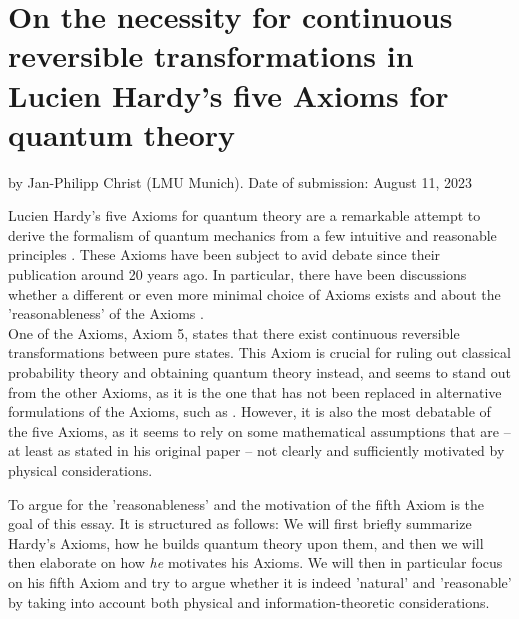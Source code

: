 \documentclass[11pt, a4paper]{article}
\begin{document}
\pagestyle{fancy}
\renewcommand{\headrulewidth}{0pt}
\renewcommand{\footrulewidth}{0pt}
\fancyhf{}

\section*{On the necessity for continuous reversible transformations in Lucien Hardy's five Axioms for quantum theory}
\vspace{-0.3cm}
\textsf{by Jan-Philipp Christ (LMU Munich). Date of submission: August 11, 2023}\par
\vspace{4pt}
Lucien Hardy's five Axioms for quantum theory are a remarkable attempt to derive the formalism of quantum mechanics from a few intuitive and reasonable principles \cite{hardy2001quantum}. These Axioms have been subject to avid debate since their publication around 20 years ago. In particular, there have been discussions whether a different or even more minimal choice of Axioms exists \cite{Schack_2003, Masanes_2011} and about the 'reasonableness' of the Axioms \cite{DARRIGOL}.\\
One of the Axioms, Axiom 5, states that there exist continuous reversible transformations between pure states. This Axiom is crucial for ruling out classical probability theory and obtaining quantum theory instead, and seems to stand out from the other Axioms, as it is the one that has not been replaced in alternative formulations of the Axioms, such as \cite{Schack_2003, Masanes_2011}. However, it is also the most debatable of the five Axioms, as it seems to rely on some mathematical assumptions that are -- at least as stated in his original paper -- not clearly and sufficiently motivated by physical considerations.\par
To argue for the 'reasonableness' and the motivation of the fifth Axiom is the goal of this essay. It is structured as follows: We will first briefly summarize Hardy's Axioms, how he builds quantum theory upon them, and then we will then elaborate on how \emph{he} motivates his Axioms. 
We will then in particular focus on his fifth Axiom and try to argue whether it is indeed 'natural' and 'reasonable' by taking into account both physical and information-theoretic considerations. \par
\vspace{8pt}
\end{document}
